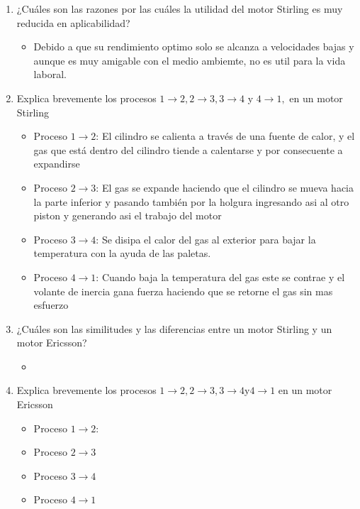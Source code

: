 \documentclass{article}
\begin{document}
\begin{enumerate}
\begin{itemize}
        \end{itemize}
    \item ¿Cuáles son las razones por las cuáles la utilidad del motor Stirling es muy reducida en aplicabilidad?
        \begin{itemize}
            \item Debido a que su rendimiento optimo solo se alcanza a velocidades bajas y aunque es muy amigable con el medio ambiemte, no es util para la vida laboral. 
        \end{itemize}
    \item Explica brevemente los procesos $1 \rightarrow 2, 2  \rightarrow 3,3 \rightarrow 4$ y $4  \rightarrow 1,$ en un motor Stirling
        \begin{itemize}
            \item Proceso $1 \rightarrow 2$: El cilindro se calienta a través de una fuente de calor, y el gas que está dentro del cilindro tiende a calentarse y por consecuente a expandirse
            \item Proceso $2 \rightarrow 3$: El gas se expande haciendo que el cilindro se mueva hacia la parte inferior y pasando también por la holgura ingresando asi al otro piston y generando asi el trabajo del motor
            \item Proceso $3 \rightarrow 4$: Se disipa el calor del gas al exterior para bajar  la temperatura con la ayuda de las paletas. 
            \item Proceso $4 \rightarrow 1$: Cuando baja la temperatura del gas este se contrae y el volante de inercia gana fuerza haciendo que se retorne el gas sin mas esfuerzo  
            
        \end{itemize}
        
    
    \item ¿Cuáles son las similitudes y las diferencias entre un motor Stirling y un motor Ericsson?
        \begin{itemize}
            \item 
        \end{itemize}
    \item Explica brevemente los procesos $1 \rightarrow 2,2 \rightarrow 3,3 \rightarrow 4 $y$ 4 \rightarrow 1$ en un motor Ericsson
        \begin{itemize}
            \item Proceso $1 \rightarrow 2$: 
            \item Proceso $2 \rightarrow 3$
            \item Proceso $3 \rightarrow 4$
            \item Proceso $4 \rightarrow 1$
        \end{itemize}
    

\end{enumerate}
\end{document}
